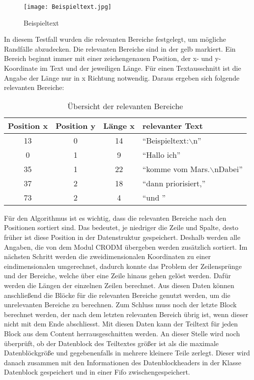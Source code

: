\begin{figure}[htb]
\centering
\texttt{[image: Beispieltext.jpg]} %
\caption{Beispieltext}
\label{fig:Beispieltext}
\end{figure}

In diesem Testfall wurden die relevanten Bereiche festgelegt, um mögliche
Randfälle abzudecken. Die relevanten Bereiche sind in
der  gelb markiert.
Ein Bereich beginnt immer mit einer zeichengenauen Position, der x- und
y-Koordinate im Text und der jeweiligen Länge. Für einen Textausschnitt ist die
Angabe der Länge nur in x Richtung notwendig. \newline
Daraus ergeben sich folgende relevanten Bereiche:

\begin{longtable}{|cccl|}
\caption{Übersicht der relevanten Bereiche} \\
\hline
\label{tab:UebersichtDerRelevantenBereiche}
\textbf{Position x} & \textbf{Position y} & \textbf{Länge x} &
\textbf{relevanter Text}\\
\hline
  13 &  0 & 14 & "`Beispieltext:\ensuremath{\backslash}n"' \\
   0 &  1 &  9 & "`Hallo ich"' \\
  35 &  1 & 22 & "`komme vom Mars.\ensuremath{\backslash}nDabei"' \\
  37 &  2 & 18 & "`dann priorisiert,"' \\
  73 &  2 &  4 & "`und "' \\
\hline
\end{longtable}

Für den Algorithmus ist es wichtig, dass die relevanten Bereiche nach den
Positionen sortiert sind. Das bedeutet, je niedriger die Zeile und Spalte, desto
früher ist diese Position in der Datenstruktur gespeichert.
Deshalb werden alle Angaben, die von dem Modul CRODM übergeben werden 
zusätzlich sortiert.
Im nächsten Schritt werden die zweidimensionalen Koordinaten zu einer
eindimensionalen umgerechnet, dadurch konnte das Problem der
Zeilensprünge und der Bereiche, welche über eine Zeile hinaus gehen
gelöst werden. Dafür werden die Längen der einzelnen Zeilen
berechnet. Aus diesen Daten können anschließend die Blöcke für die
relevanten Bereiche genutzt werden, um die unrelevanten Bereiche zu berechnen.
Zum Schluss muss noch der letzte Block berechnet werden, der nach dem letzten
relevanten Bereich übrig ist, wenn dieser nicht mit dem Ende abschliesst. Mit
diesen Daten kann der Teiltext für jeden Block aus dem Content
herrausgeschnitten werden. An dieser Stelle wird noch überprüft, ob der
Datenblock des Teiltextes größer ist als die maximale Datenblöckgröße und
gegebenenfalls in mehrere kleinere Teile zerlegt. Dieser wird danach zusammen
mit den Informationen des Datenblockheaders in der Klasse Datenblock
gespeichert und in einer Fifo zwischengespeichert. \newline

